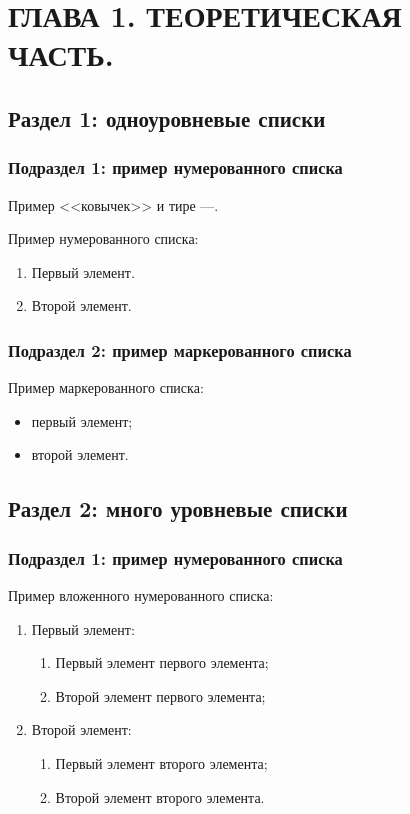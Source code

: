 \chapter{\label{ch:ch01}ГЛАВА 1. ТЕОРЕТИЧЕСКАЯ ЧАСТЬ.} %

\section{\label{sec:ch01/sec01}Раздел 1: одноуровневые списки}

\subsection{\label{subsec:ch01/sec01/sub01}Подраздел 1: пример нумерованного списка}

Пример <<ковычек>> и тире ---.

Пример нумерованного списка:
\begin{enumerate}
\item Первый элемент.
\item Второй элемент.
\end{enumerate}

\subsection{\label{subsec:ch01/sec01/sub02}Подраздел 2: пример маркерованного списка}

Пример маркерованного списка:
\begin{itemize}
\item первый элемент;
\item второй элемент.
\end{itemize}

\section{\label{sec:ch01/sec02}Раздел 2: много уровневые списки}

\subsection{\label{subsec:ch01/sec02/sub01}Подраздел 1: пример нумерованного списка}

Пример вложенного нумерованного списка:
\begin{enumerate}
\item Первый элемент:
\begin{enumerate}
\item Первый элемент первого элемента;
\item Второй элемент первого элемента;
\end{enumerate}
\item Второй элемент:
\begin{enumerate}
\item Первый элемент второго элемента;
\item Второй элемент второго элемента.
\end{enumerate}
\end{enumerate}


